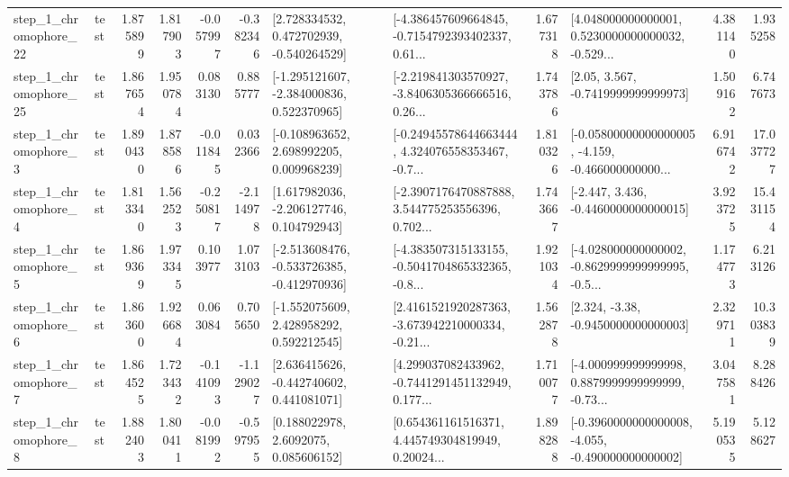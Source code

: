 \begin{tabular}{llrrrrllrlrr}
    step\_1\_chromophore\_22 &      test &      1.875899 &    1.817903 &     -0.057997 & -0.382346 &    [2.728334532, 0.472702939, -0.540264529] &  [-4.386457609664845, -0.7154792393402337, 0.61... &       1.677318 &  [4.048000000000001, 0.5230000000000032, -0.529... &            4.381140 &          1.935258 \\
    step\_1\_chromophore\_25 &      test &      1.867654 &    1.950784 &      0.083130 &  0.885777 &   [-1.295121607, -2.384000836, 0.522370965] &  [-2.219841303570927, -3.8406305366666516, 0.26... &       1.743786 &                 [2.05, 3.567, -0.7419999999999973] &            1.509162 &          6.747673 \\
     step\_1\_chromophore\_3 &      test &      1.890430 &    1.878586 &     -0.011845 &  0.032366 &    [-0.108963652, 2.698992205, 0.009968239] &  [-0.24945578644663444, 4.324076558353467, -0.7... &       1.810326 &  [-0.05800000000000005, -4.159, -0.466000000000... &            6.916742 &         17.037727 \\
     step\_1\_chromophore\_4 &      test &      1.813340 &    1.562523 &     -0.250817 & -2.114978 &    [1.617982036, -2.206127746, 0.104792943] &  [-2.3907176470887888, 3.544775253556396, 0.702... &       1.743667 &               [-2.447, 3.436, -0.4460000000000015] &            3.923725 &         15.431154 \\
     step\_1\_chromophore\_5 &      test &      1.869369 &    1.973345 &      0.103977 &  1.073103 &  [-2.513608476, -0.533726385, -0.412970936] &  [-4.383507315133155, -0.5041704865332365, -0.8... &       1.921034 &  [-4.028000000000002, -0.8629999999999995, -0.5... &            1.174773 &          6.213126 \\
     step\_1\_chromophore\_6 &      test &      1.863600 &    1.926684 &      0.063084 &  0.705650 &    [-1.552075609, 2.428958292, 0.592212545] &  [2.4161521920287363, -3.673942210000334, -0.21... &       1.562878 &                [2.324, -3.38, -0.9450000000000003] &            2.329711 &         10.303839 \\
     step\_1\_chromophore\_7 &      test &      1.864525 &    1.723432 &     -0.141093 & -1.129027 &    [2.636415626, -0.442740602, 0.441081071] &  [4.299037082433962, -0.7441291451132949, 0.177... &       1.710077 &  [-4.000999999999998, 0.8879999999999999, -0.73... &            3.047581 &          8.288426 \\
     step\_1\_chromophore\_8 &      test &      1.882403 &    1.800411 &     -0.081992 & -0.597955 &       [0.188022978, 2.6092075, 0.085606152] &  [0.654361161516371, 4.445749304819949, 0.20024... &       1.898288 &  [-0.3960000000000008, -4.055, -0.490000000000002] &            5.190535 &          5.128627 \\

\end{tabular}
